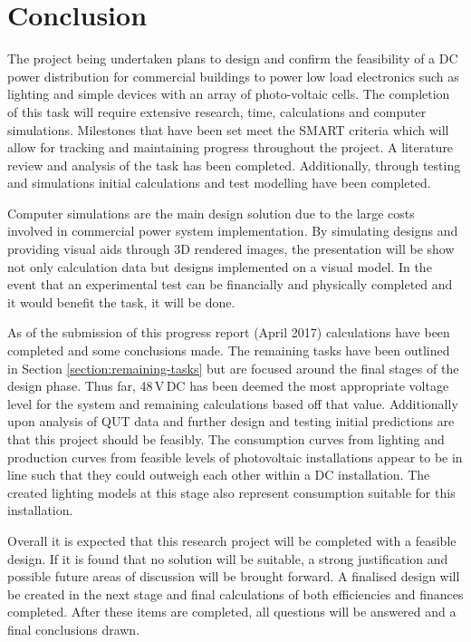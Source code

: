 \section{Conclusion}

The project being undertaken plans to design and confirm the feasibility of a DC power distribution for commercial buildings to power low load electronics such as lighting and simple devices with an array of photo-voltaic cells. The completion of this task will require extensive research, time, calculations and computer simulations. Milestones that have been set meet the SMART criteria which will allow for tracking and maintaining progress throughout the project. A literature review and analysis of the task has been completed. Additionally, through testing and simulations initial calculations and test modelling have been completed. 
\newline

Computer simulations are the main design solution due to the large costs involved in commercial power system implementation. By simulating designs and providing visual aids through 3D rendered images, the presentation will be show not only calculation data but designs implemented on a visual model. In the event that an experimental test can be financially and physically completed and it would benefit the task, it will be done.   
\newline

As of the submission of this progress report (April 2017) calculations have been completed and some conclusions made. The remaining tasks have been outlined in Section \ref{section:remaining-tasks} but are focused around the final stages of the design phase. Thus far, 48\,V\,DC has been deemed the most appropriate voltage level for the system and remaining calculations based off that value. Additionally upon analysis of QUT data and further design and testing initial predictions are that this project should be feasibly. The consumption curves from lighting and production curves from feasible levels of photovoltaic installations appear to be in line such that they could outweigh each other within a DC installation. The created lighting models at this stage also represent consumption suitable for this installation.  
\newline

Overall it is expected that this research project will be completed with a feasible design. If it is found that no solution will be suitable, a strong justification and possible future areas of discussion will be brought forward. A finalised design will be created in the next stage and final calculations of both efficiencies and finances completed. After these items are completed, all questions will be answered and a final conclusions drawn.  
\newpage
